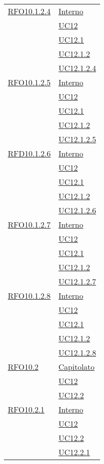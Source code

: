 \begin{longtable}{|>{\centering}m{5cm}|m{5cm}<{\centering}|}
 \hyperlink{RFO10.1.2.4}{RFO10.1.2.4} 
 & \hyperlink{Interno}{Interno}\\
& \hyperref[UC12]{UC12}\\
& \hyperref[UC12.1]{UC12.1}\\
& \hyperref[UC12.1.2]{UC12.1.2}\\
& \hyperref[UC12.1.2.4]{UC12.1.2.4}\\\hline

 \hyperlink{RFO10.1.2.5}{RFO10.1.2.5} 
 & \hyperlink{Interno}{Interno}\\
& \hyperref[UC12]{UC12}\\
& \hyperref[UC12.1]{UC12.1}\\
& \hyperref[UC12.1.2]{UC12.1.2}\\
& \hyperref[UC12.1.2.5]{UC12.1.2.5}\\\hline

 \hyperlink{RFD10.1.2.6}{RFD10.1.2.6} 
 & \hyperlink{Interno}{Interno}\\
& \hyperref[UC12]{UC12}\\
& \hyperref[UC12.1]{UC12.1}\\
& \hyperref[UC12.1.2]{UC12.1.2}\\
& \hyperref[UC12.1.2.6]{UC12.1.2.6}\\\hline

 \hyperlink{RFO10.1.2.7}{RFO10.1.2.7} 
 & \hyperlink{Interno}{Interno}\\
& \hyperref[UC12]{UC12}\\
& \hyperref[UC12.1]{UC12.1}\\
& \hyperref[UC12.1.2]{UC12.1.2}\\
& \hyperref[UC12.1.2.7]{UC12.1.2.7}\\\hline

\hyperlink{RFO10.1.2.8}{RFO10.1.2.8} 
 & \hyperlink{Interno}{Interno}\\
& \hyperref[UC12]{UC12}\\
& \hyperref[UC12.1]{UC12.1}\\
& \hyperref[UC12.1.2]{UC12.1.2}\\
& \hyperref[UC12.1.2.8]{UC12.1.2.8}\\\hline

 \hyperlink{RFO10.2}{RFO10.2} 
 & \hyperlink{Capitolato}{Capitolato}\\\
& \hyperref[UC12]{UC12}\\
& \hyperref[UC12.2]{UC12.2}\\\hline

 \hyperlink{RFO10.2.1}{RFO10.2.1} 
 & \hyperlink{Interno}{Interno}\\
& \hyperref[UC12]{UC12}\\
& \hyperref[UC12.2]{UC12.2}\\
& \hyperref[UC12.2.1]{UC12.2.1}\\\hline


\end{longtable}
